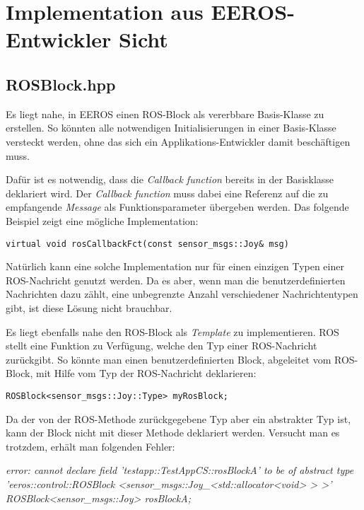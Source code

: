 \chapter{Implementation aus EEROS-Entwickler Sicht}


\section{ROSBlock.hpp}
Es liegt nahe, in EEROS einen ROS-Block als vererbbare Basis-Klasse zu erstellen.
So könnten alle notwendigen Initialisierungen in einer Basis-Klasse versteckt werden, ohne das sich ein Applikations-Entwickler damit beschäftigen muss.

Dafür ist es notwendig, dass die \textit{Callback function} bereits in der Basisklasse deklariert wird.
Der \textit{Callback function} muss dabei eine Referenz auf die zu empfangende \textit{Message} als Funktionsparameter übergeben werden.
Das folgende Beispiel zeigt eine mögliche Implementation:

\lstset{language=C++}
\begin{lstlisting}
virtual void rosCallbackFct(const sensor_msgs::Joy& msg)
\end{lstlisting}

Natürlich kann eine solche Implementation nur für einen einzigen Typen einer ROS-Nachricht genutzt werden.
Da es aber, wenn man die benutzerdefinierten Nachrichten dazu zählt, eine unbegrenzte Anzahl verschiedener Nachrichtentypen gibt, ist diese Lösung nicht brauchbar. %

Es liegt ebenfalls nahe den ROS-Block als \textit{Template} zu implementieren.
ROS stellt eine Funktion zu Verfügung, welche den Typ einer ROS-Nachricht zurückgibt.
So könnte man einen benutzerdefinierten Block, abgeleitet vom ROS-Block, mit Hilfe vom Typ der ROS-Nachricht deklarieren:

\lstset{language=C++}
\begin{lstlisting}
ROSBlock<sensor_msgs::Joy::Type> myRosBlock;
\end{lstlisting}

Da der von der ROS-Methode zurückgegebene Typ aber ein abstrakter Typ ist, kann der Block nicht mit dieser Methode deklariert werden.
Versucht man es trotzdem, erhält man folgenden Fehler:

\textit{
error: cannot declare field 'testapp::TestAppCS::rosBlockA' to be of abstract type 'eeros::control::ROSBlock
<sensor\_msgs::Joy\_<std::allocator<void> > >'\\
\-\hspace{2cm} ROSBlock<sensor\_msgs::Joy> rosBlockA;
}
